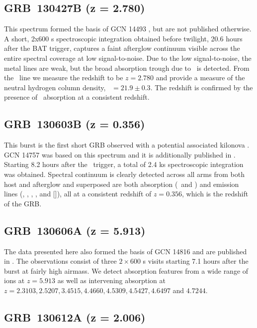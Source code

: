 \documentclass[longauth]{aa}    %
\begin{document}
\subsection{GRB~130427B (z = 2.780)} \label{130427B}

This spectrum formed the basis of GCN 14493 \citep{GCN14493}, but are not
published otherwise. A short, 2x600 s spectroscopic integration obtained before
twilight, 20.6 hours after the BAT trigger, captures a faint afterglow continuum
visible across the entire spectral coverage at low signal-to-noise. Due to the
low signal-to-noise, the metal lines are weak, but the broad absorption trough
due to \lya~is detected. From the \lya~line we measure the redshift to be $z =
2.780$ and provide a measure of the neutral hydrogen column density, \nh~$= 21.9
\pm 0.3$. The redshift is confirmed by the presence of \feii~absorption at a
consistent redshift.

\subsection{GRB~130603B (z = 0.356)}\label{130603}

This burst is the first short GRB observed with a potential associated kilonova
\citep{Tanvir2013a, Berger2013a}.  GCN 14757 \citep{GCN14757} was based on this
spectrum and it is additionally published in \citet{DeUgartePostigo2014e}.
Starting 8.2 hours after the \swift~trigger, a total of 2.4 ks spectroscopic
integration was obtained. Spectral continuum is clearly detected across all arms
from both host and afterglow and superposed are both absorption (\cahk~and
\mgii) and emission lines (\oii, \hb, \oiii, \ha, and [\sii]), all at a
consistent redshift of $z = 0.356$, which is the redshift of the GRB.

\subsection{GRB~130606A (z = 5.913)}\label{130606}

The data presented here also formed the basis of GCN 14816 \citep{GCN14816} and
are published in \citet{Hartoog2015}. The observations consist of three
$2\times600$ s visits starting 7.1 hours after the burst at fairly high airmass.
We detect absorption features from a wide range of ions at $z=5.913$ as well as
intervening absorption at $z=2.3103, 2.5207, 3.4515, 4.4660, 4.5309, 4.5427,
4.6497 $ and $ 4.7244$.


\subsection{GRB~130612A (z = 2.006)}\label{130612}
\end{document}
